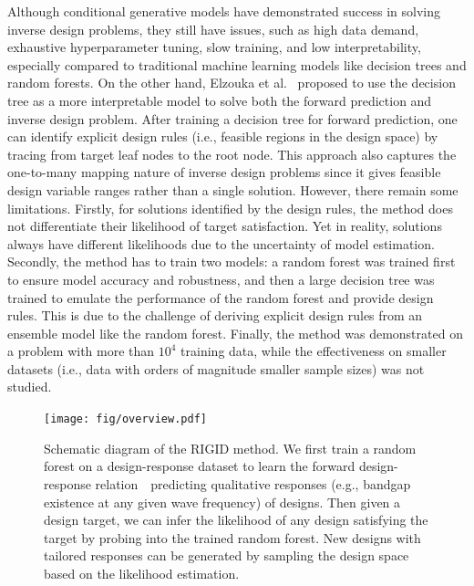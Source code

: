 \documentclass{article}
\begin{document}
Although conditional generative models have demonstrated success in solving inverse design problems, they still have issues, such as high data demand, exhaustive hyperparameter tuning, slow training, and low interpretability, especially compared to traditional machine learning models like decision trees and random forests. On the other hand, Elzouka et al.~\cite{elzouka2020interpretable} proposed to use the decision tree as a more interpretable model to solve both the forward prediction and inverse design problem. After training a decision tree for forward prediction, one can identify explicit design rules (i.e., feasible regions in the design space) by tracing from target leaf nodes to the root node. This approach also captures the one-to-many mapping nature of inverse design problems since it gives feasible design variable ranges rather than a single solution. However, there remain some limitations. Firstly, for solutions identified by the design rules, the method does not differentiate their likelihood of target satisfaction. Yet in reality, solutions always have different likelihoods due to the uncertainty of model estimation. Secondly, the method has to train two models: a random forest was trained first to ensure model accuracy and robustness, and then a large decision tree was trained to emulate the performance of the random forest and provide design rules. This is due to the challenge of deriving explicit design rules from an ensemble model like the random forest. Finally, the method was demonstrated on a problem with more than $10^4$ training data, while the effectiveness on smaller datasets (i.e., data with orders of magnitude smaller sample sizes) was not studied.

\begin{figure}[h]
\centering
\texttt{[image: fig/overview.pdf]}
\caption{Schematic diagram of the RIGID method. We first train a random forest on a design-response dataset to learn the forward design-response relation~\textemdash~predicting qualitative responses (e.g., bandgap existence at any given wave frequency) of designs. Then given a design target, we can infer the likelihood of any design satisfying the target by probing into the trained random forest. New designs with tailored responses can be generated by sampling the design space based on the likelihood estimation.}
\label{fig:overview}
\end{figure}
\end{document}
